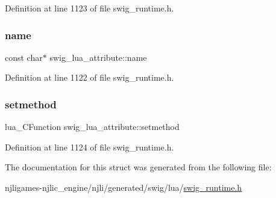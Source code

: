 Definition at line 1123 of file swig\+\_\+runtime.\+h.

\mbox{\label{structswig__lua__attribute_a693d9481784dfd89e0d9ed3aadf51b04}} 
\subsubsection{\texorpdfstring{name}{name}}
{\footnotesize\ttfamily const char$\ast$ swig\+\_\+lua\+\_\+attribute\+::name}



Definition at line 1122 of file swig\+\_\+runtime.\+h.

\mbox{\label{structswig__lua__attribute_a0b88e38d5417453e7718f7090b797b06}} 
\subsubsection{\texorpdfstring{setmethod}{setmethod}}
{\footnotesize\ttfamily lua\+\_\+\+C\+Function swig\+\_\+lua\+\_\+attribute\+::setmethod}



Definition at line 1124 of file swig\+\_\+runtime.\+h.



The documentation for this struct was generated from the following file\+:\begin{DoxyCompactItemize}
\item 
njligames-\/njlic\+\_\+engine/njli/generated/swig/lua/\mbox{\hyperlink{swig__runtime_8h}{swig\+\_\+runtime.\+h}}\end{DoxyCompactItemize}

